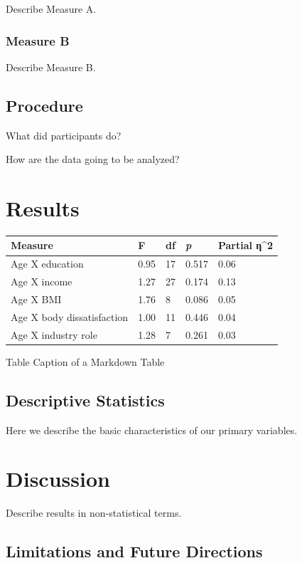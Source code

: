 \documentclass[
  jou,
  longtable,
  colorlinks=true,linkcolor=blue,citecolor=blue,urlcolor=blue]{apa7}
\begin{document}
Describe Measure A.

\subsubsection{Measure B}\label{measure-b}

Describe Measure B.

\subsection{Procedure}\label{procedure}

What did participants do?

How are the data going to be analyzed?

\section{Results}\label{results-1}

\begin{longtable}[]{@{}lllll@{}}
\toprule\noalign{}
Measure & F & df & \emph{p} & Partial η\^{}2 \\
\midrule\noalign{}
\endhead
\bottomrule\noalign{}
\endlastfoot
Age X education & 0.95 & 17 & 0.517 & 0.06 \\
Age X income & 1.27 & 27 & 0.174 & 0.13 \\
Age X BMI & 1.76 & 8 & 0.086 & 0.05 \\
Age X body dissatisfaction & 1.00 & 11 & 0.446 & 0.04 \\
Age X industry role & 1.28 & 7 & 0.261 & 0.03 \\
\end{longtable}

Table Caption of a Markdown Table

\subsection{Descriptive Statistics}\label{descriptive-statistics}

Here we describe the basic characteristics of our primary variables.

\section{Discussion}\label{discussion}

Describe results in non-statistical terms.

\subsection{Limitations and Future
Directions}\label{limitations-and-future-directions}
\end{document}
